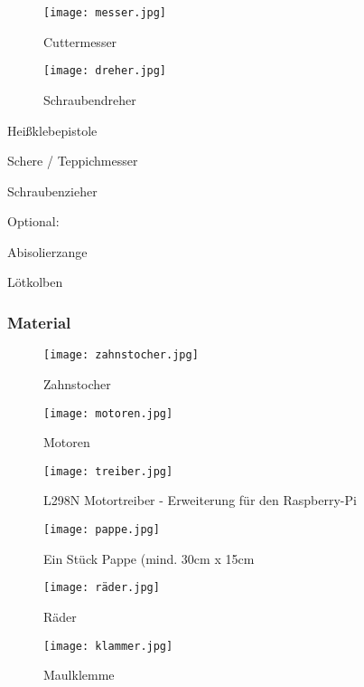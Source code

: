 \begin{figure}[H]
\centering
\parbox{5cm}{
\texttt{[image: messer.jpg]}
\caption*{Cuttermesser}
}
\qquad
\begin{minipage}{5cm}
\texttt{[image: dreher.jpg]}
\caption*{Schraubendreher}
\end{minipage}
\end{figure}
\begin{checklist}
    \item Heißklebepistole
    \item Schere / Teppichmesser
    \item Schraubenzieher

    \begin{checklist}
    \item[] Optional:
    \item Abisolierzange
    \item Lötkolben
    \end{checklist}
\end{checklist}

\subsubsection{Material}

\begin{figure}[H]
\centering
\parbox{5cm}{
\texttt{[image: zahnstocher.jpg]}
\caption*{Zahnstocher}
}
\qquad
\begin{minipage}{5cm}
\texttt{[image: motoren.jpg]}
\caption*{Motoren}
\end{minipage}
\end{figure}

\begin{figure}[H]
\centering
\parbox{5cm}{
\texttt{[image: treiber.jpg]}
\caption*{L298N Motortreiber - Erweiterung für den Raspberry-Pi}
}
\qquad
\begin{minipage}{5cm}
\texttt{[image: pappe.jpg]}
\caption*{Ein Stück Pappe (mind. 30cm x 15cm}
\end{minipage}
\end{figure}

\begin{figure}[H]
\centering
\parbox{5cm}{
\texttt{[image: räder.jpg]}
\caption*{Räder}
}
\qquad
\begin{minipage}{5cm}
\texttt{[image: klammer.jpg]}
\caption*{Maulklemme}
\end{minipage}
\end{figure}

